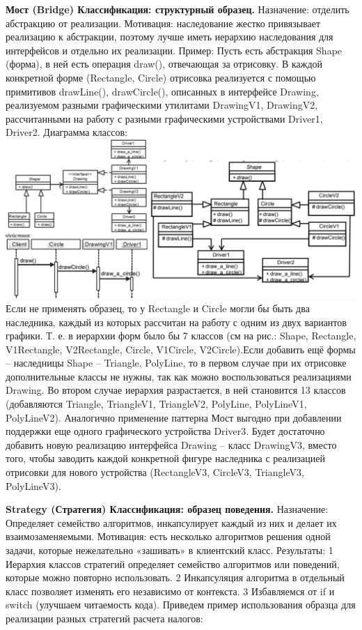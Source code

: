 \textbf{Мост (Bridge) Классификация: структурный образец.}
Назначение: отделить абстракцию от реализации.
Мотивация: наследование жестко привязывает реализацию к абстракции, поэтому лучше иметь иерархию наследования для интерфейсов и отдельно их реализации.
Пример: Пусть есть абстракция Shape (форма), в ней есть операция draw(), отвечающая за отрисовку. В каждой конкретной форме (Rectangle, Circle) отрисовка реализуется с помощью примитивов drawLine(), drawCircle(), описанных в интерфейсе Drawing, реализуемом разными графическими утилитами DrawingV1, DrawingV2, рассчитанными на работу с разными графическими устройствами Driver1, Driver2. Диаграмма классов:
\includegraphics[scale=0.055]{pics/5_1.png}
Если не применять образец, то у Rectangle и Circle могли бы быть два наследника, каждый из которых рассчитан на работу с одним из двух вариантов графики. Т. е. в иерархии форм было бы 7 классов (см на рис.: Shape, Rectangle, V1Rectangle, V2Rectangle, Circle, V1Circle, V2Circle).Если добавить ещё формы – наследницы Shape – Triangle, PolyLine, то в первом случае при их отрисовке дополнительные классы не нужны, так как можно воспользоваться реализациями Drawing. Во втором случае иерархия разрастается, в ней становится 13 классов (добавляются Triangle, TriangleV1, TriangleV2, PolyLine, PolyLineV1, PolyLineV2). Аналогично применение паттерна Мост выгодно при добавлении поддержки еще одного графического устройства Driver3. Будет достаточно добавить новую реализацию интерфейса Drawing – класс DrawingV3, вместо того, чтобы заводить каждой конкретной фигуре наследника с реализацией отрисовки для нового устройства (RectangleV3, CircleV3, TriangleV3, PolyLineV3).

\textbf{Strategy (Стратегия) Классификация: образец поведения.} Назначение: Определяет семейство алгоритмов, инкапсулирует каждый из них и делает их взаимозаменяемыми. Мотивация: есть несколько алгоритмов решения одной задачи, которые нежелательно «зашивать» в клиентский класс. Результаты: 1 Иерархия классов стратегий определяет семейство алгоритмов или поведений, которые можно повторно использовать. 2 Инкапсуляция алгоритма в отдельный класс позволяет изменять его независимо от контекста. 3 Избавляемся от if и switch (улучшаем читаемость кода). Приведем пример использования образца для реализации разных стратегий расчета налогов:

